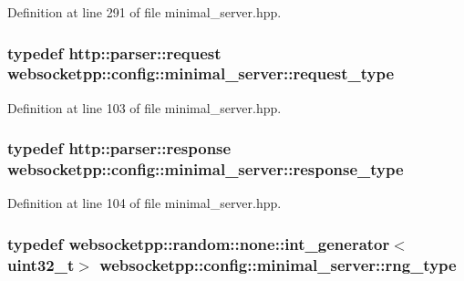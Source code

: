 Definition at line 291 of file minimal\+\_\+server.\+hpp.

\hypertarget{structwebsocketpp_1_1config_1_1minimal__server_a7b07ee40c2b25c39fb8e333f969df8e3}{}
\subsubsection[{request\+\_\+type}]{\setlength{\rightskip}{0pt plus 5cm}typedef {\bf http\+::parser\+::request} {\bf websocketpp\+::config\+::minimal\+\_\+server\+::request\+\_\+type}}\label{structwebsocketpp_1_1config_1_1minimal__server_a7b07ee40c2b25c39fb8e333f969df8e3}


Definition at line 103 of file minimal\+\_\+server.\+hpp.

\hypertarget{structwebsocketpp_1_1config_1_1minimal__server_a19b0c06176d183a59e47bfe065b132ff}{}
\subsubsection[{response\+\_\+type}]{\setlength{\rightskip}{0pt plus 5cm}typedef {\bf http\+::parser\+::response} {\bf websocketpp\+::config\+::minimal\+\_\+server\+::response\+\_\+type}}\label{structwebsocketpp_1_1config_1_1minimal__server_a19b0c06176d183a59e47bfe065b132ff}


Definition at line 104 of file minimal\+\_\+server.\+hpp.

\hypertarget{structwebsocketpp_1_1config_1_1minimal__server_a7f3520a016124fc86f907bcf934f74f2}{}
\subsubsection[{rng\+\_\+type}]{\setlength{\rightskip}{0pt plus 5cm}typedef {\bf websocketpp\+::random\+::none\+::int\+\_\+generator}$<$uint32\+\_\+t$>$ {\bf websocketpp\+::config\+::minimal\+\_\+server\+::rng\+\_\+type}}\label{structwebsocketpp_1_1config_1_1minimal__server_a7f3520a016124fc86f907bcf934f74f2}


